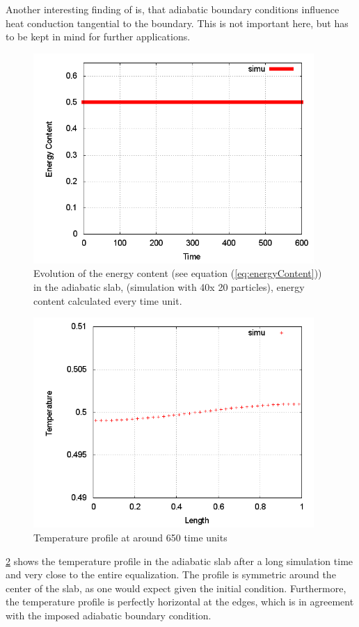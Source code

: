 \documentclass{report}
\begin{document}
Another interesting finding of \cite{Cleary1999} is, that adiabatic boundary conditions influence heat conduction tangential to the boundary. This is not important here, but has to be kept in mind for further applications.

\begin{figure}[h]  
  \label{fig:PureHeat_EnergyEvolution}
  \centering
  \includegraphics[width=0.95\textwidth]{Graphics/results/PureHeatConduction/EnergyContentEvolution}
  \caption{Evolution of the energy content (see equation (\ref{eq:energyContent})) in the adiabatic slab, (simulation with 40x 20 particles), energy content calculated every time unit.}
\end{figure}

\begin{figure}[h]  
  \label{fig:PureHeat_TProfile}
  \centering
  \includegraphics[width=0.95\textwidth]{Graphics/results/PureHeatConduction/T_profile000650062499}
  \caption{Temperature profile at around 650 time units}
\end{figure}
\ref{fig:PureHeat_TProfile} shows the temperature profile in the adiabatic slab 
after a long simulation time and very close to the entire equalization. The profile is symmetric around the center of the slab, as one would expect given the initial condition. Furthermore, the temperature profile is perfectly horizontal at the edges, which is in agreement with the imposed adiabatic boundary condition.
\end{document}
